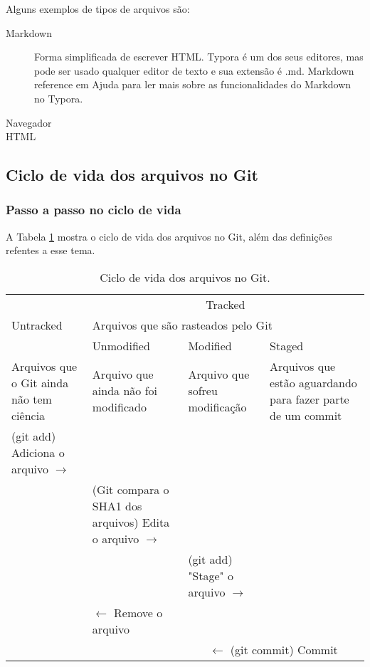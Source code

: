 \documentclass[12pt,a4paper]{article}
\begin{document}
	Alguns exemplos de tipos de arquivos são:
	\begin{description}
		\item[Markdown] Forma simplificada de escrever HTML. Typora é um dos seus editores, mas pode ser usado qualquer editor de texto e sua extensão é .md. Markdown reference em Ajuda para ler mais sobre as funcionalidades do Markdown no Typora.
		\item[Navegador] 
		\item[HTML] 
	\end{description}
	
	\subsection{Ciclo de vida dos arquivos no Git}
	\subsubsection{Passo a passo no ciclo de vida}
	
	A Tabela \ref{tab:CicloDeVida} mostra o ciclo de vida dos arquivos no Git, além das definições refentes a esse tema.  
	
	\begin{table}[!htpb]
		\centering
		\begin{tabular}{|p{}|p{}|p{}|p{}|}
			\hline
			\multirow{3}{*}{Untracked} & \multicolumn{3}{c|}{Tracked} \\
			\cline{2-4}
			& \multicolumn{3}{l|}{Arquivos que são rasteados pelo Git} \\
			\cline{2-4}
			& Unmodified & Modified & Staged \\
			\hline
			Arquivos que o Git ainda não tem ciência & Arquivo que ainda não foi modificado & Arquivo que sofreu modificação & Arquivos que estão aguardando para fazer parte de um commit \\
			\hline
			(git add) Adiciona o arquivo $\rightarrow$ & & & \\
			\hline
			& (Git compara o SHA1 dos arquivos) Edita o arquivo $\rightarrow$ & &  \\
			\hline
			&  & (git add) "Stage" o arquivo $\rightarrow$ & \\
			\hline
			& $\leftarrow$ Remove o arquivo &  & \\
			\hline
			&  & \multicolumn{2}{|c|}{$\leftarrow$ (git commit) Commit} \\
			\hline
		\end{tabular}
	\caption{Ciclo de vida dos arquivos no Git.}
	\label{tab:CicloDeVida}
	\end{table}
	
\end{document}
